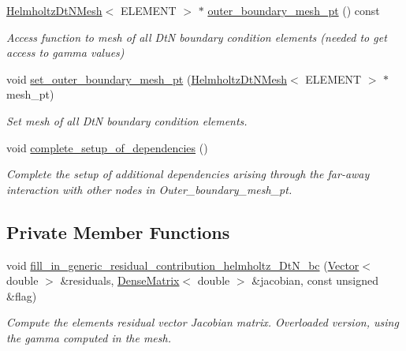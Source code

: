 \begin{DoxyCompactItemize}
\hyperlink{classoomph_1_1HelmholtzDtNMesh}{Helmholtz\+Dt\+N\+Mesh}$<$ E\+L\+E\+M\+E\+NT $>$ $\ast$ \hyperlink{classoomph_1_1HelmholtzDtNBoundaryElement_a28b795a0c330435e1132a6e0694916cf}{outer\+\_\+boundary\+\_\+mesh\+\_\+pt} () const
\begin{DoxyCompactList}\small\item\em Access function to mesh of all DtN boundary condition elements (needed to get access to gamma values) \end{DoxyCompactList}\item 
void \hyperlink{classoomph_1_1HelmholtzDtNBoundaryElement_a8079cc033c8b300917c79af27367dc33}{set\+\_\+outer\+\_\+boundary\+\_\+mesh\+\_\+pt} (\hyperlink{classoomph_1_1HelmholtzDtNMesh}{Helmholtz\+Dt\+N\+Mesh}$<$ E\+L\+E\+M\+E\+NT $>$ $\ast$mesh\+\_\+pt)
\begin{DoxyCompactList}\small\item\em Set mesh of all DtN boundary condition elements. \end{DoxyCompactList}\item 
void \hyperlink{classoomph_1_1HelmholtzDtNBoundaryElement_aefb821cc3b61a602ab5ca9dd9d843a63}{complete\+\_\+setup\+\_\+of\+\_\+dependencies} ()
\begin{DoxyCompactList}\small\item\em Complete the setup of additional dependencies arising through the far-\/away interaction with other nodes in Outer\+\_\+boundary\+\_\+mesh\+\_\+pt. \end{DoxyCompactList}\end{DoxyCompactItemize}
\subsection*{Private Member Functions}
\begin{DoxyCompactItemize}
\item 
void \hyperlink{classoomph_1_1HelmholtzDtNBoundaryElement_a1cc37a3e79fac04fbe2a778ebf770c2c}{fill\+\_\+in\+\_\+generic\+\_\+residual\+\_\+contribution\+\_\+helmholtz\+\_\+\+Dt\+N\+\_\+bc} (\hyperlink{classoomph_1_1Vector}{Vector}$<$ double $>$ \&residuals, \hyperlink{classoomph_1_1DenseMatrix}{Dense\+Matrix}$<$ double $>$ \&jacobian, const unsigned \&flag)
\begin{DoxyCompactList}\small\item\em Compute the element\textquotesingle{}s residual vector Jacobian matrix. Overloaded version, using the gamma computed in the mesh. \end{DoxyCompactList}\end{DoxyCompactItemize}
